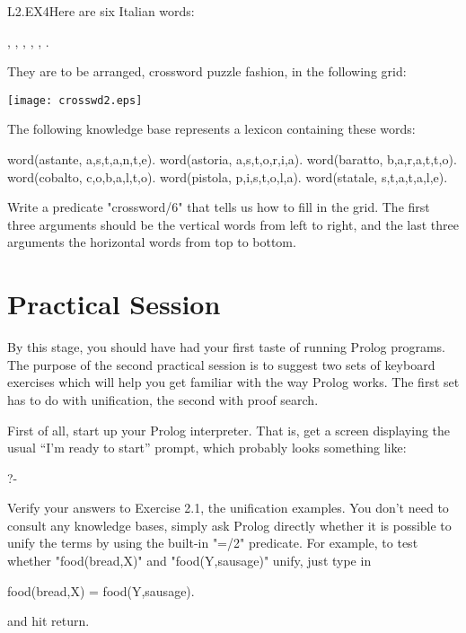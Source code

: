 \begin{LPNexercise}{L2.EX4}Here are six Italian words:

, , ,
, , .

\noindent
They are to be arranged, crossword puzzle
fashion, in the following grid:

\bigskip
\begin{center}
\texttt{[image: crosswd2.eps]}
\end{center}
\bigskip

The following knowledge base represents a lexicon containing these
words:
\begin{LPNcodedisplay}
word(astante, a,s,t,a,n,t,e).
word(astoria, a,s,t,o,r,i,a).
word(baratto, b,a,r,a,t,t,o).
word(cobalto, c,o,b,a,l,t,o).
word(pistola, p,i,s,t,o,l,a).
word(statale, s,t,a,t,a,l,e).
\end{LPNcodedisplay}
Write a predicate "crossword/6" that tells us how to fill in the grid.
The first three arguments should be the vertical words from left to
right, and the last three arguments the horizontal words from top
to bottom.\end{LPNexercise}


\section{Practical Session}\label{SEC.L2.PRAXIS}


By this stage, you should have had your first taste of running Prolog
programs. The purpose of the second practical session is to suggest
two sets of keyboard exercises which will help you get familiar with
the way Prolog works. The first set has to do with unification, the
second with proof search.

First of all, start up your Prolog interpreter. That is, get a screen
displaying the usual ``I'm ready to start'' prompt, which probably looks
something like:
\begin{LPNcodedisplay}
?-
\end{LPNcodedisplay}
Verify your answers to Exercise 2.1, the unification examples. You
don't need to consult any knowledge bases, simply ask Prolog directly
whether it is possible to unify the terms by using the built-in "=/2"
predicate. For example, to test whether "food(bread,X)" and
"food(Y,sausage)" unify, just type in
\begin{LPNcodedisplay}
food(bread,X) = food(Y,sausage).
\end{LPNcodedisplay}
%
and hit return.

